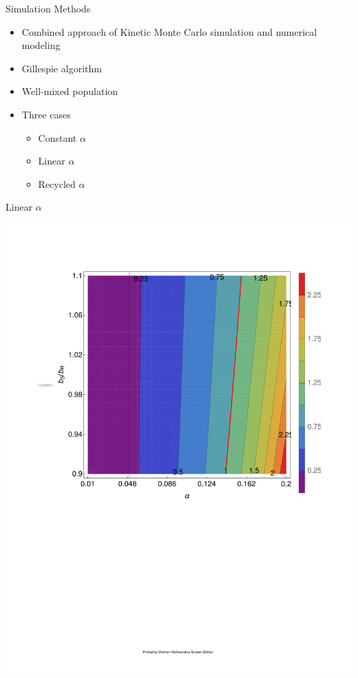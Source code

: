\documentclass[final]{beamer}
\newlength{\onecolwid}
\begin{document}
\begin{frame}[t]
\begin{columns}[t]
\begin{column}{\onecolwid}
\begin{block}{Simulation Methods}

\begin{itemize}
  \item Combined approach of Kinetic Monte Carlo simulation and numerical modeling
  \item Gillespie algorithm
  \item Well-mixed population
  \item Three cases
  \begin{itemize}
    \item Constant $\alpha$
    \item Linear $\alpha$
    \item Recycled $\alpha$
  \end{itemize}
\end{itemize}

\end{block}


    \begin{alertblock}{Linear $\alpha$}

    \begin{center}
      \includegraphics[width=0.9\columnwidth]{../dev/graphics/Jul14/const_alpha_contour.pdf}


\end{center}
\end{alertblock}
\end{column}
\end{columns}
\end{frame}
\end{document}
